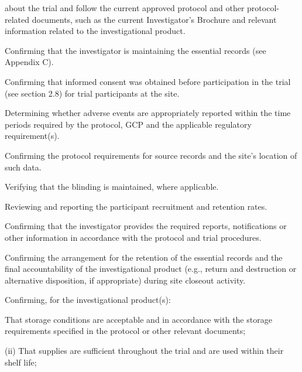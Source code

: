 \documentclass[11pt]{article}
\begin{document}
about the trial and follow the current approved protocol and other protocol-related documents, such as the current Investigator's Brochure and relevant information related to the investigational product.


\begin{description}[leftmargin=2.5cm,style=sameline]

\item[(c)] Confirming that the investigator is maintaining the essential records (see Appendix C).

\item[(d)] Confirming that informed consent was obtained before participation in the trial (see section 2.8) for trial participants at the site.

\item[(e)] Determining whether adverse events are appropriately reported within the time periods required by the protocol, GCP and the applicable regulatory requirement(s).

\item[(f)] Confirming the protocol requirements for source records and the site's location of such data.

\item[(g)] Verifying that the blinding is maintained, where applicable.

\item[(h)] Reviewing and reporting the participant recruitment and retention rates.

\item[(i)] Confirming that the investigator provides the required reports, notifications or other information in accordance with the protocol and trial procedures.

\item[(j)] Confirming the arrangement for the retention of the essential records and the final accountability of the investigational product (e.g., return and destruction or alternative disposition, if appropriate) during site closeout activity.

\item[(a)] Confirming, for the investigational product(s):

\item[(i)] That storage conditions are acceptable and in accordance with the storage requirements specified in the protocol or other relevant documents;

\end{description}

(ii) That supplies are sufficient throughout the trial and are used within their shelf life;
\end{document}
